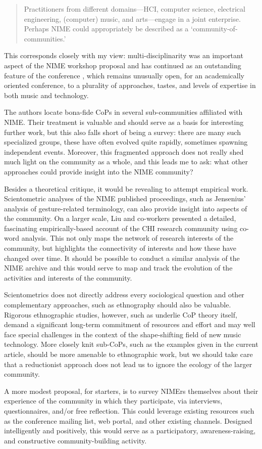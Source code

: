 \begin{quotation}
Practitioners from different domains---HCI, computer science, electrical engineering, (computer) music, and arts---engage in a joint enterprise. Perhaps NIME could appropriately be described as a \lq community-of-communities.\rq
\end{quotation}

This corresponds closely with my view: multi-disciplinarity was an important aspect of the NIME workshop proposal \cite{Poupyrev:2001a} and has continued as an outstanding feature of the conference \cite{Lyons:2015}, which remains unusually open, for an academically oriented conference, to a plurality of approaches, tastes, and levels of expertise in both music and technology.

The authors locate bona-fide CoPs in several sub-communities affiliated with NIME. Their treatment is valuable and should serve as a basis for interesting further work, but this also falls short of being a survey: there are many such specialized groups, these have often evolved quite rapidly, sometimes spawning independent events. Moreover, this fragmented approach does not really shed much light on the community as a whole, and this leads me to ask: what other approaches could provide insight into the NIME community? 

Besides a theoretical critique, it would be revealing to attempt empirical work. Scientometric analyses of the NIME published proceedings, such as Jensenius' analysis \cite{Jensenius:2014} of gesture-related terminology, can also provide insight into aspects of the community. On a larger scale, Liu and co-workers \cite{Liu:2014} presented a detailed, fascinating empirically-based account of the CHI research community using co-word analysis. This not only maps the network of research interests of the community, but highlights the connectivity of interests and how these have changed over time. It should be possible to conduct a similar analysis of the NIME archive and this would serve to map and track the evolution of the activities and interests of the community.

Scientometrics does not directly address every sociological question and other complementary approaches, such as ethnography should also be valuable. Rigorous ethnographic studies, however, such as underlie CoP theory itself, demand a significant long-term commitment of resources and effort and may well face special challenges in the context of the shape-shifting field of new music technology. More closely knit sub-CoPs, such as the examples given in the current article, should be more amenable to ethnographic work, but we should take care that a reductionist approach does not lead us to ignore the ecology of the larger community.

A more modest proposal, for starters, is to survey NIMErs themselves about their experience of the community in which they participate, via interviews, questionnaires, and/or free reflection. This could leverage existing resources such as the conference mailing list, web portal, and other existing channels. Designed intelligently and positively, this would serve as a participatory, awareness-raising, and constructive community-building activity.
